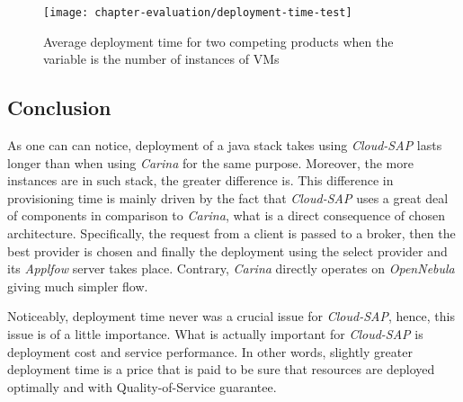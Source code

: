 \begin{figure}[!ht]
  \begin{center}
    \texttt{[image: chapter-evaluation/deployment-time-test]}
  \end{center}
  \caption{Average deployment time for two competing products when the variable is the number of instances of VMs}
  \label{ch7:deployment-time-test}
\end{figure}

\subsection*{Conclusion}
As one can can notice, deployment of a java stack takes using \emph{Cloud-SAP} lasts longer than when using \emph{Carina} for the same purpose. Moreover, the more instances are in such stack, the greater difference is. This difference in provisioning time is mainly driven by the fact that \emph{Cloud-SAP} uses a great deal of components in comparison to \emph{Carina}, what is a direct consequence of chosen architecture. Specifically, the request from a client is passed to a broker, then the best provider is chosen and finally the deployment using the select provider and its \emph{Applfow} server takes place. Contrary, \emph{Carina} directly operates on \emph{OpenNebula} giving much simpler flow.

Noticeably, deployment time never was a crucial issue for \emph{Cloud-SAP}, hence, this issue is of a little importance. What is actually important for \emph{Cloud-SAP} is deployment cost and service performance. In other words, slightly greater deployment time is a price that is paid to be sure that resources are deployed optimally and with Quality-of-Service guarantee.

